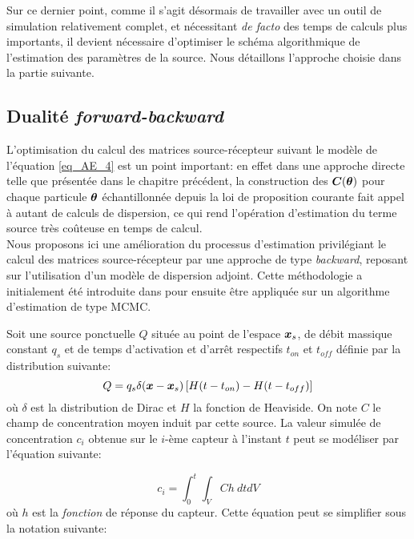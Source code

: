 Sur ce dernier point, comme il s'agit désormais de travailler avec un outil de simulation relativement complet, et nécessitant \textit{de facto} des temps de calculs plus importants, il devient nécessaire d'optimiser le schéma algorithmique de l'estimation des paramètres de la source. Nous détaillons l'approche choisie dans la partie suivante.


\subsection{Dualité \textit{forward-backward}}

L'optimisation du calcul des matrices source-récepteur suivant le modèle de l'équation \eqref{eq_AE_4} est un point important: en effet dans une approche directe telle que présentée dans le chapitre précédent, la construction des ${\bm{C}}({\bm{\theta}})$ pour chaque particule ${\bm{\theta}}$ échantillonnée depuis la loi de proposition courante fait appel à autant de calculs de dispersion, ce qui rend l'opération d'estimation du terme source très coûteuse en temps de calcul.\\

Nous proposons ici une amélioration du processus d'estimation privilégiant le calcul des matrices source-récepteur par une approche de type \textit{backward}, reposant sur l'utilisation d'un modèle de dispersion adjoint. Cette méthodologie a initialement été introduite dans \cite{Keats2007} pour ensuite être appliquée sur un algorithme d'estimation de type MCMC.

Soit une source ponctuelle $Q$ située au point de l'espace ${\bm{x}_s}$, de débit massique constant $q_s$ et de temps d'activation et d'arrêt respectifs $t_{on}$ et $t_{off}$ définie par la distribution suivante:\\

\begin{equation}
	Q = q_s \delta({\bm{x}} - {\bm{x}_s})\left[H(t - t_{on}) - H(t - t_{off})\right]
\end{equation}
où $\delta$ est la distribution de Dirac et $H$ la fonction de Heaviside. On note $C$ le champ de concentration moyen induit par cette  source. La valeur simulée de concentration $c_i$ obtenue sur le $i$-ème capteur à l'instant $t$ peut se modéliser par l'équation suivante:

\begin{equation}
c_i = \int_0^t \int_V C h ~dtdV
\label{eq_int_direct}
\end{equation}
où $h$ est la \textit{fonction} de réponse du capteur. Cette équation peut se simplifier sous la notation suivante:\\

